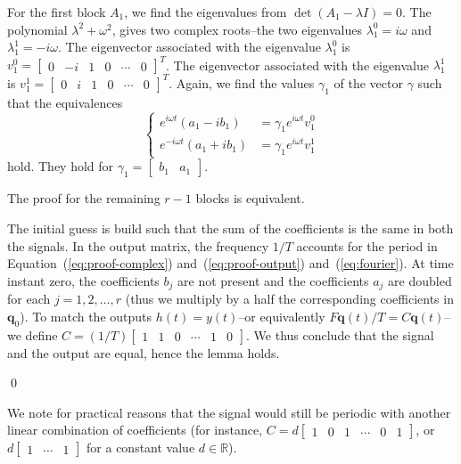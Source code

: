\documentclass[letterpaper,10pt,journal,twoside]{IEEEtran}
\theoremstyle{definition}
\begin{document}
For the first block $A_1$, we find the eigenvalues from $\det(A_1-\lambda I)=0$. The polynomial $\lambda^2+\omega^2$, gives two complex roots--the two eigenvalues $\lambda_1^0=i\omega$ and $\lambda_1^1=-i\omega$. The eigenvector associated with the eigenvalue $\lambda_1^0$ is $v_1^0=\begin{bmatrix}0 & -i&1&0&\cdots&0\end{bmatrix}^T$. The eigenvector associated with the eigenvalue $\lambda_1^1$ is $v_1^1=\begin{bmatrix}0&i&1&0&\cdots&0\end{bmatrix}^T$. Again, we find the values $\gamma_1$ of the vector $\gamma$ such that the equivalences 
\begin{equation*}\begin{cases}
  e^{i\omega t}(a_1-ib_1)&=\gamma_1 e^{i\omega t}v_1^0\\
  e^{-i\omega t}(a_1+ib_1)&=\gamma_1 e^{i\omega t}v_1^1
\end{cases}\end{equation*}
hold. They hold for $\gamma_1=\begin{bmatrix}b_1&a_1\end{bmatrix}$. 

The proof for the remaining $r-1$ blocks is equivalent.

The initial guess is build such that the sum of the coefficients is the same in both the signals. In the output matrix, the frequency $1/T$ accounts for the period in Equation~(\ref{eq:proof-complex}) and~(\ref{eq:proof-output}) and~(\ref{eq:fourier}). At time instant zero, the coefficients $b_j$ are not present and the coefficients $a_j$ are doubled for each $j=1,2,\dots,r$ (thus we multiply by a half the corresponding coefficients in $\mathbf{q}_0$). To match the outputs $h(t)=y(t)$--or equivalently $F\mathbf{q}(t)/T=C\mathbf{q}(t)$--we define $C=(1/T)\begin{bmatrix}1 & 1 & 0 & \cdots & 1 & 0\end{bmatrix}$. We thus conclude that the signal and the output are equal, hence the lemma holds.

\qed

We note for practical reasons that the signal would still be periodic with another linear combination of coefficients (for instance, $C=d\begin{bmatrix}1 & 0 & 1 & \cdots & 0 & 1\end{bmatrix}$, or $d\begin{bmatrix}1 & \cdots & 1\end{bmatrix}$ for a constant value $d\in\mathbb{R}$).
\end{document}
